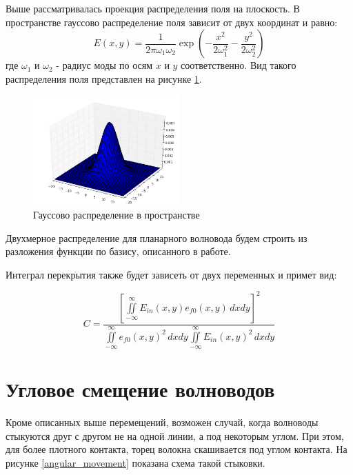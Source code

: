 Выше рассматривалась проекция распределения поля на плоскость. В пространстве гауссово распределение поля зависит от двух координат и равно:
\begin{equation}
  \label{gauss3d}
  E(x,y)=\frac{1}{2\pi\omega_1\omega_2}\exp\left(-\frac{x^2}{2\omega_1^2}-\frac{y^2}{2\omega_2^2}\right)
\end{equation}
где $\omega_1$ и $\omega_2$ - радиус моды по осям $x$ и $y$ соответственно. Вид такого распределения поля представлен на рисунке \ref{gauss3dPlot}.
\begin{figure}[h!]
	\includegraphics[width=0.5\textwidth]{img/gauss3d.png}
	\caption{Гауссово распределение в пространстве}
	\label{gauss3dPlot}
\end{figure}

Двухмерное распределение для планарного волновода будем строить из разложения функции по базису, описанного в работе\cite{vlada}.

Интеграл перекрытия также будет зависеть от двух переменных и примет вид:

\begin{equation}
	\label{coupling_2d}
	C = \frac{\left[\iint\limits_{-\infty}^{\infty}E_{in}(x,y)e_{f0}(x,y) \,dxdy\right]^2}
	{\iint\limits_{-\infty}^{\infty}e_{f0}(x,y)^2 \,dxdy
	 \iint\limits_{-\infty}^{\infty}E_{in}(x,y)^2 \,dxdy}
\end{equation}

\section{Угловое смещение волноводов}
Кроме описанных выше перемещений, возможен случай, когда волноводы стыкуются друг с другом не на одной линии, а под некоторым углом. При этом, для более плотного контакта, торец волокна скашивается под углом контакта. На рисунке \ref{angular_movement} показана схема такой стыковки.

